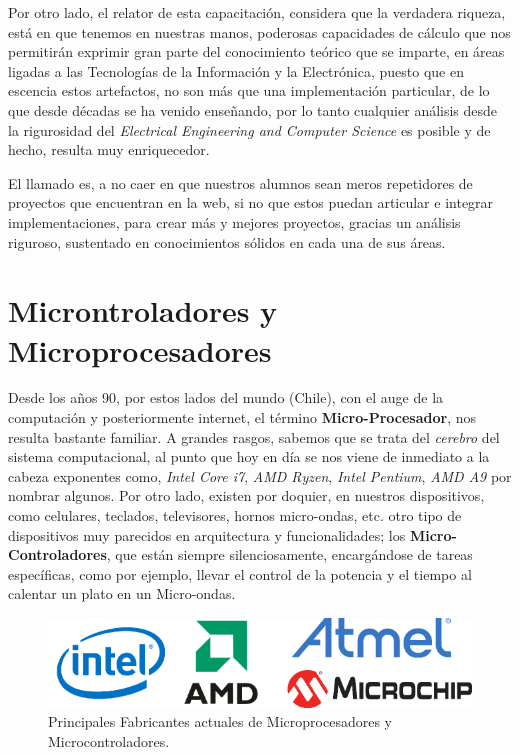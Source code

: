 \documentclass[letterpaper, 10pt]{report}
\begin{document}
Por otro lado, el relator de esta capacitación, considera que la verdadera riqueza, está en que tenemos en nuestras manos, poderosas capacidades de cálculo que nos permitirán exprimir gran parte del conocimiento teórico que se imparte, en áreas ligadas a las Tecnologías de la Información y la Electrónica, puesto que en escencia estos artefactos, no son más que una implementación particular, de lo que desde décadas se ha venido enseñando, por lo tanto cualquier análisis desde la rigurosidad del \emph{Electrical Engineering and Computer Science} es posible y de hecho, resulta muy enriquecedor.

El llamado es, a no caer en que nuestros alumnos sean meros repetidores de proyectos que encuentran en la web, si no que estos puedan articular e integrar implementaciones, para crear más y mejores proyectos, gracias un análisis riguroso, sustentado en conocimientos sólidos en cada una de sus áreas.

\section{Microntroladores y Microprocesadores}
	
	Desde los años 90, por estos lados del mundo (Chile), con el auge de la computación y posteriormente internet, el término \textbf{Micro-Procesador}, nos resulta bastante familiar. A grandes rasgos, sabemos que se trata del \emph{cerebro} del sistema computacional, al punto que hoy en día se nos viene de inmediato a la cabeza exponentes como, \emph{Intel Core i7}, \emph{AMD Ryzen}, \emph{Intel Pentium}, \emph{AMD A9} por nombrar algunos. Por otro lado, existen por doquier, en nuestros dispositivos, como celulares, teclados, televisores, hornos micro-ondas, etc. otro tipo de dispositivos muy parecidos en arquitectura y funcionalidades; los \textbf{Micro-Controladores}, que están siempre silenciosamente, encargándose de tareas específicas, como por ejemplo, llevar el control de la potencia y el tiempo al calentar un plato en un Micro-ondas.
	
	\begin{figure}[h]
		\centering
		\includegraphics[scale=0.8]{logoFabricantes.png}
		\caption{Principales Fabricantes actuales de Microprocesadores y Microcontroladores. \label{fabricantes}}
	\end{figure}
	
\end{document}
